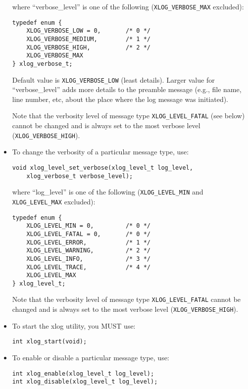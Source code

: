 \documentclass[11pt]{article}
\begin{document}
\begin{itemize}
  where ``verbose\_level'' is one of the following (\verb=XLOG_VERBOSE_MAX=
  excluded):

\begin{verbatim}
typedef enum {
    XLOG_VERBOSE_LOW = 0,       /* 0 */
    XLOG_VERBOSE_MEDIUM,        /* 1 */
    XLOG_VERBOSE_HIGH,          /* 2 */
    XLOG_VERBOSE_MAX
} xlog_verbose_t;
\end{verbatim}

  Default value is \verb=XLOG_VERBOSE_LOW= (least details).
  Larger value for ``verbose\_level'' adds more details to the
  preamble message (e.g., file name, line number, etc, about the place
  where the log message was initiated).

  Note that the verbosity level of message type \verb=XLOG_LEVEL_FATAL= (see
  below) cannot be changed and is always set to the most verbose level
  (\verb=XLOG_VERBOSE_HIGH=).

  \item To change the verbosity of a particular message type, use:

\begin{verbatim}
void xlog_level_set_verbose(xlog_level_t log_level,
	xlog_verbose_t verbose_level);
\end{verbatim}

  where ``log\_level'' is one of the following (\verb=XLOG_LEVEL_MIN=
  and \verb=XLOG_LEVEL_MAX= excluded):

\begin{verbatim}
typedef enum {
    XLOG_LEVEL_MIN = 0,         /* 0 */
    XLOG_LEVEL_FATAL = 0,       /* 0 */
    XLOG_LEVEL_ERROR,           /* 1 */
    XLOG_LEVEL_WARNING,         /* 2 */
    XLOG_LEVEL_INFO,            /* 3 */
    XLOG_LEVEL_TRACE,           /* 4 */
    XLOG_LEVEL_MAX
} xlog_level_t;
\end{verbatim}

  Note that the verbosity level of message type \verb=XLOG_LEVEL_FATAL=
  cannot be changed and is always set to the most verbose level
  (\verb=XLOG_VERBOSE_HIGH=).

  \item To start the xlog utility, you MUST use:

\begin{verbatim}
int xlog_start(void);
\end{verbatim}

  \item To enable or disable a particular message type, use:

\begin{verbatim}
int xlog_enable(xlog_level_t log_level);
int xlog_disable(xlog_level_t log_level);
\end{verbatim}


\end{itemize}
\end{document}
